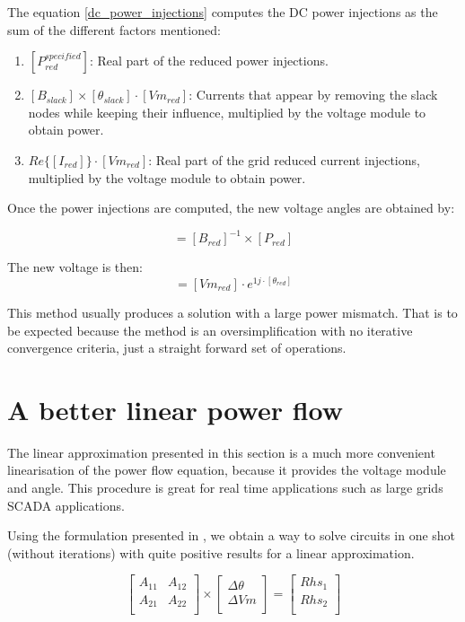 \documentclass[nols,a4paper,twoside,notoc,fleqn]{tufte-book}
\begin{document}
The equation \ref{dc_power_injections} computes the DC power injections as the sum of the different factors mentioned:

\begin{enumerate}
	\item $[P^{specified}_{red}]$: Real part of the reduced power injections.
	\item $[{B}_{slack}] \times [{\theta}_{slack}] \cdot [Vm_{red}]$: Currents that appear by removing the slack nodes while keeping their influence, multiplied by the voltage module to obtain power.
	\item $Re \{ [I_{red}] \}  \cdot [Vm_{red}]$: Real part of the grid reduced current injections, multiplied by the voltage module to obtain power.
\end{enumerate}

Once the power injections are computed, the new voltage angles are obtained by:

\begin{equation}
[\theta_{red}] = [B_{red}]^{-1} \times [P_{red}]
\end{equation}

The new voltage is then:
\begin{equation}
[{V}_{red}] = [{Vm}_{red}] \cdot e^{1j \cdot  [\theta_{red}]}
\end{equation}

This method usually produces a solution with a large power mismatch. That is to be expected because the method is an oversimplification with no iterative convergence criteria, just a straight forward set of operations.


\section{A better linear power flow} \label{ACPF}

The linear approximation presented in this section is a much more convenient linearisation of the power flow equation, because it provides the voltage module and angle. This procedure is great for real time applications such as large grids SCADA applications.

Using the formulation presented in \cite{rossoni2016linearized}, we obtain a way to solve circuits in one shot (without iterations) with quite positive results for a linear approximation.

\begin{equation}
\begin{bmatrix}
A_{11} & A_{12} \\
A_{21} & A_{22} \\
\end{bmatrix}
\times
\begin{bmatrix}
\Delta \theta\\
\Delta Vm\\
\end{bmatrix}
=
\begin{bmatrix}
Rhs_1\\
Rhs_2\\
\end{bmatrix}
\label{eq:AC_linear_power_flow}
\end{equation}
\end{document}
